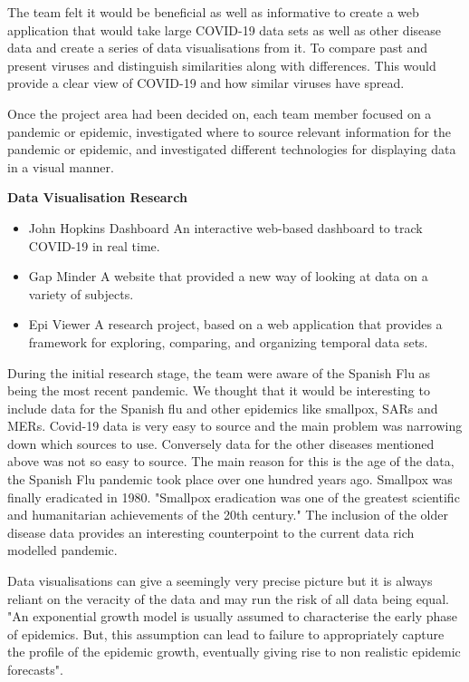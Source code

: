 The team felt it would be beneficial as well as informative to create a web application that would take large COVID-19 data sets as well as other disease data and create a series of data visualisations from it. To compare past and present viruses and distinguish similarities along with differences. This would provide a clear view of COVID-19 and how similar viruses have spread.

\vspace{3mm} %
Once the project area had been decided on, each team member focused on a pandemic or epidemic, investigated where to source relevant information for the pandemic or epidemic, and investigated different technologies for displaying data in a visual manner.

\vspace{5mm}

\textbf{Data Visualisation Research}
\begin{itemize}
    \item John Hopkins Dashboard
            An interactive web-based dashboard to track COVID-19 in real time.
    \item Gap Minder
            A website that provided a new way of looking at data on a variety of subjects.
    \item Epi Viewer
            A research project, based on a web application that provides a framework for exploring, comparing, and organizing temporal data sets.
    
\end{itemize}

During the initial research stage, the team were aware of the Spanish Flu as being the most recent pandemic. We thought that it would be interesting to include data for the Spanish flu and other epidemics like smallpox, SARs and MERs. Covid-19 data is very easy to source and the main problem was narrowing down which sources to use. Conversely data for the other diseases mentioned above was not so easy to source. The main reason for this is the age of the data, the Spanish Flu pandemic took place over one hundred years ago. Smallpox was finally eradicated in 1980. 
"Smallpox eradication was one of the greatest scientific and humanitarian achievements of the 20th century."\cite{Smallpox} The inclusion of the older disease data provides an interesting counterpoint to the current data rich modelled pandemic.

\vspace{2mm}

Data visualisations can give a seemingly very precise picture but it is always reliant on the veracity of the data and may run the risk of all data being equal. "An exponential growth model is usually assumed to characterise the early phase of epidemics. But, this assumption can lead to failure to appropriately capture the profile of the epidemic growth, eventually giving rise to non realistic epidemic forecasts"\cite{tovissode2020use}.




